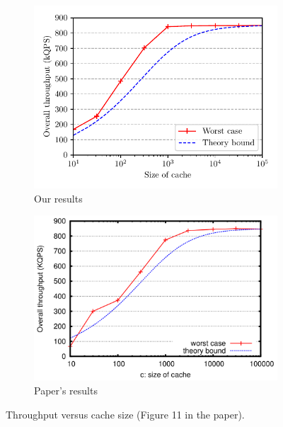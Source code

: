 \documentclass[10pt,letterpaper]{article}
\begin{document}
\begin{figure}[h]
\centering
\begin{subfigure}[t]{.47\textwidth}
	\centering	
	\includegraphics[scale=0.73]{img/throughput_vs_cache_size.pdf}
	\caption{Our results}
\end{subfigure}\hfill
\begin{subfigure}[t]{.47\textwidth}
	\centering
	\includegraphics[scale=0.2]{img/throughput_vs_cache_size_paper.png}
	\caption{Paper's results}
\end{subfigure}
\caption{Throughput versus cache size (Figure 11 in the paper).}
\label{fig:throughput_vs_cache_size}
\end{figure}
\end{document}
